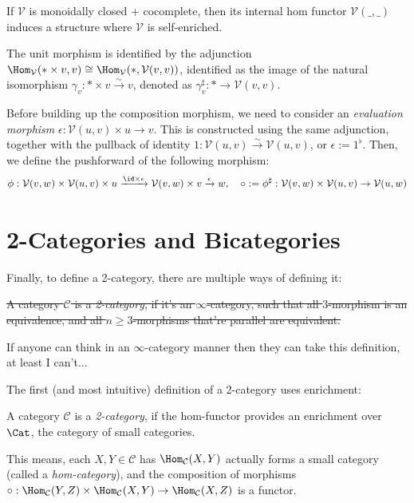 \documentclass{article}
\begin{document}
\begin{exmp}
    If $\mathcal{V}$ is monoidally closed + cocomplete, then its internal hom functor $\mathcal{V}(\_,\_)$ induces a structure where $\mathcal{V}$ is self-enriched.

    The unit morphism is identified by the adjunction $\Hom_\mathcal{V}(*\times v,v)\cong \Hom_\mathcal{V}(*,\mathcal{V}(v,v))$, identified as the image of the natural isomorphism $\gamma_v:*\times v\xrightarrow{\sim}v$, denoted as $\gamma_v^\sharp:*\rightarrow\mathcal{V}(v,v)$. 

    Before building up the composition morphism, we need to consider an \emph{evaluation morphism} $\epsilon:\mathcal{V}(u,v)\times u\rightarrow v$. This is constructed using the same adjunction, together with the pullback of identity $1:\mathcal{V}(u,v)\xrightarrow{\sim}\mathcal{V}(u,v)$, or $\epsilon := 1^\flat$. Then, we define the pushforward of the following morphism:
    \[\phi:\mathcal{V}(v,w)\times \mathcal{V}(u,v)\times u\xrightarrow{\id\times \epsilon}\mathcal{V}(v,w)\times v\xrightarrow{\epsilon}w,\quad \circ := \phi^\sharp:\mathcal{V}(v,w)\times\mathcal{V}(u,v)\rightarrow \mathcal{V}(u,w)\]
\end{exmp}

\newpage

\section{2-Categories and Bicategories}

Finally, to define a 2-category, there are multiple ways of defining it:
\begin{defn}
    \sout{A category $\mathcal{C}$ is a \emph{2-category}, if it's an $\infty$-category, such that all $3$-morphism is an equivalence, and all $n\geq 3$-morphisms that're parallel are equivalent.}
\end{defn}
If anyone can think in an $\infty$-category manner then they can take this definition, at least I can't...

\hfil

The first (and most intuitive) definition of a 2-category uses enrichment:

\begin{defn}
    A category $\mathcal{C}$ is a \emph{2-category}, if the hom-functor provides an enrichment over $\Cat$, the category of small categories.
\end{defn}
This means, each $X,Y\in\mathcal{C}$ has $\Hom_\mathcal{C}(X,Y)$ actually forms a small category (called a \emph{hom-category}), and the composition of morphisms $\circ:\Hom_\mathcal{C}(Y,Z)\times \Hom_\mathcal{C}(X,Y)\rightarrow\Hom_\mathcal{C}(X,Z)$ is a functor.
\end{document}
